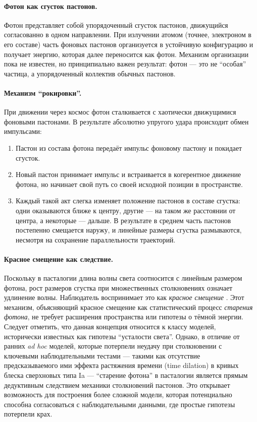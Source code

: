 \documentclass[pdflatex,sn-mathphys-num,referee]{sn-jnl}
\begin{document}
\paragraph{Фотон как сгусток пастонов.} 
Фотон представляет собой упорядоченный сгусток пастонов, движущийся согласованно в одном направлении. При излучении атомом (точнее, электроном в его составе) часть фоновых пастонов организуется в устойчивую конфигурацию и получает энергию, которая далее переносится как фотон. Механизм организации пока не известен, но принципиально важен результат: фотон — это не ``особая'' частица, а упорядоченный коллектив обычных пастонов.

\paragraph{Механизм ``рокировки''.}
При движении через космос фотон сталкивается с хаотически движущимися фоновыми пастонами. В результате абсолютно упругого удара происходит обмен импульсами: 
\begin{enumerate}
  \item Пастон из состава фотона передаёт импульс фоновому пастону и покидает сгусток.
  \item Новый пастон принимает импульс и встраивается в когерентное движение фотона, но начинает свой путь со своей исходной позиции в пространстве.
  \item Каждый такой акт слегка изменяет положение пастонов в составе сгустка: одни оказываются ближе к центру, другие — на таком же расстоянии от центра, а некоторые — дальше. В результате в среднем часть пастонов постепенно смещается наружу, и линейные размеры сгустка размываются, несмотря на сохранение параллельности траекторий.
\end{enumerate}

\paragraph{Красное смещение как следствие.}
Поскольку в пасталогии длина волны света соотносится с линейным размером фотона, рост размеров сгустка при множественных столкновениях означает удлинение волны. Наблюдатель воспринимает это как \emph{красное смещение} \cite{hubble1929}. Этот механизм, объясняющий красное смещение как статистический процесс \emph{старения фотона}, не требует расширения пространства или гипотезы о тёмной энергии. Следует отметить, что данная концепция относится к классу моделей, исторически известных как гипотезы ``усталости света''. Однако, в отличие от ранних \textit{ad hoc} моделей, которые потерпели неудачу при столкновении с ключевыми наблюдательными тестами --- такими как отсутствие предсказываемого ими эффекта растяжения времени (time dilation) в кривых блеска сверхновых типа Ia \cite{goldhaber2001-dilation} --- ``старение фотона'' в пасталогии является прямым дедуктивным следствием механики столкновений пастонов. Это открывает возможность для построения более сложной модели, которая потенциально способна согласоваться с наблюдательными данными, где простые гипотезы потерпели крах.
\end{document}
